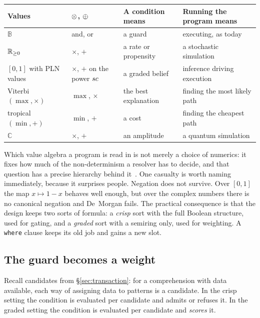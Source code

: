 \begin{center}
\small
\begin{tabular}{@{}L{0.16\textwidth}L{0.20\textwidth}L{0.26\textwidth}L{0.30\textwidth}@{}}
\toprule
\textbf{Values} & \textbf{$\otimes$, $\oplus$} & \textbf{A condition means} & \textbf{Running the program means} \\
\midrule
$\mathbb{B}$ &
and, or &
a guard &
executing, as today \\[3pt]
$\mathbb{R}_{\geq 0}$ &
$\times$, $+$ &
a rate or propensity &
a stochastic simulation \\[3pt]
$[0,1]$ with PLN values &
$\times$, $+$ on the power $sc$ &
a graded belief &
inference driving execution \\[3pt]
Viterbi $(\max,\times)$ &
$\max$, $\times$ &
the best explanation &
finding the most likely path \\[3pt]
tropical $(\min,+)$ &
$\min$, $+$ &
a cost &
finding the cheapest path \\[3pt]
$\mathbb{C}$ &
$\times$, $+$ &
an amplitude &
a quantum simulation \\
\bottomrule
\end{tabular}
\end{center}

Which value algebra a program is read in is not merely a choice of numerics: it
fixes how much of the non-determinism a resolver has to decide, and that
question has a precise
hierarchy behind it~\cite{ChoiceFormulae}. One casualty is worth naming
immediately, because it surprises people. Negation
does not survive. Over $[0,1]$ the map $x \mapsto 1-x$ behaves well enough, but
over the complex numbers there is no canonical negation and De~Morgan fails. The
practical consequence is that the design keeps two sorts of formula: a
\emph{crisp} sort with the full Boolean structure, used for gating, and a
\emph{graded} sort with a semiring only, used for weighting. A \texttt{where}
clause keeps its old job and gains a new slot.

\subsection{The guard becomes a weight}

Recall candidates from \S\ref{sec:transaction}: for a comprehension with data
available, each way of assigning data to patterns is a candidate. In the crisp
setting the condition is evaluated per candidate and admits or refuses it. In
the graded setting the condition is evaluated per candidate and \emph{scores}
it.


